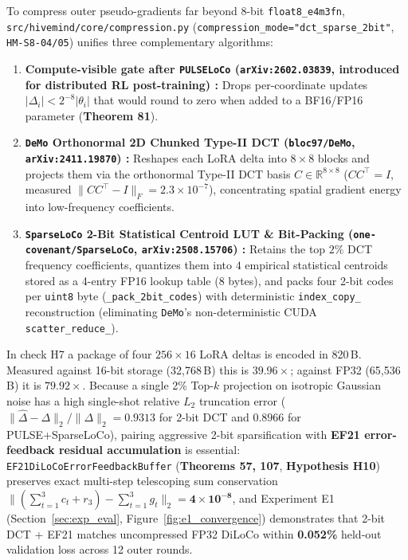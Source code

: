 \documentclass[11pt,a4paper]{article}
\begin{document}
To compress outer pseudo-gradients far beyond 8-bit \texttt{float8\_e4m3fn}, \texttt{src/hivemind/core/compression.py} (\texttt{compression\_mode="dct\_sparse\_2bit"}, \texttt{HM-S8-04/05}) unifies three complementary algorithms:
\begin{enumerate}[leftmargin=1.8em]
    \item \textbf{Compute-visible gate after \texttt{PULSELoCo} (\texttt{arXiv:2602.03839}, introduced for distributed RL post-training) \cite{miahi2026pulseloco}:} Drops per-coordinate updates $|\Delta_i| < 2^{-8} |\theta_i|$ that would round to zero when added to a BF16/FP16 parameter (\textbf{Theorem 81}).
    \item \textbf{\texttt{DeMo} Orthonormal 2D Chunked Type-II DCT (\texttt{bloc97/DeMo}, \texttt{arXiv:2411.19870}) \cite{peng2024demo}:} Reshapes each LoRA delta into $8 \times 8$ blocks and projects them via the orthonormal Type-II DCT basis $C \in \mathbb{R}^{8 \times 8}$ ($C C^\top = I$, measured $\|C C^\top - I\|_F = 2.3 \times 10^{-7}$), concentrating spatial gradient energy into low-frequency coefficients.
    \item \textbf{\texttt{SparseLoCo} 2-Bit Statistical Centroid LUT \& Bit-Packing (\texttt{one-covenant/SparseLoCo}, \texttt{arXiv:2508.15706}) \cite{sarfi2025sparseloco}:} Retains the top $2\%$ DCT frequency coefficients, quantizes them into $4$ empirical statistical centroids stored as a 4-entry FP16 lookup table (8 bytes), and packs four 2-bit codes per \texttt{uint8} byte (\texttt{\_pack\_2bit\_codes}) with deterministic \texttt{index\_copy\_} reconstruction (eliminating \texttt{DeMo}'s non-deterministic CUDA \texttt{scatter\_reduce\_}).
\end{enumerate}
In check H7 a package of four $256 \times 16$ LoRA deltas is encoded in 820\,B. Measured against 16-bit storage (32{,}768\,B) this is $39.96\times$; against FP32 (65{,}536\,B) it is $79.92\times$. Because a single 2\% Top-$k$ projection on isotropic Gaussian noise has a high single-shot relative $L_2$ truncation error ($\|\hat{\Delta} - \Delta\|_2 / \|\Delta\|_2 = 0.9313$ for 2-bit DCT and $0.8966$ for PULSE+SparseLoCo), pairing aggressive 2-bit sparsification with \textbf{EF21 error-feedback residual accumulation} \cite{richtarik2021ef21} is essential: \texttt{EF21DiLoCoErrorFeedbackBuffer} (\textbf{Theorems 57, 107}, \textbf{Hypothesis H10}) preserves exact multi-step telescoping sum conservation $\|(\sum_{t=1}^3 c_t + r_3) - \sum_{t=1}^3 g_t\|_2 = \mathbf{4 \times 10^{-8}}$, and Experiment E1 (Section~\ref{sec:exp_eval}, Figure~\ref{fig:e1_convergence}) demonstrates that 2-bit DCT + EF21 matches uncompressed FP32 DiLoCo within \textbf{0.052\%} held-out validation loss across 12 outer rounds.
\end{document}
